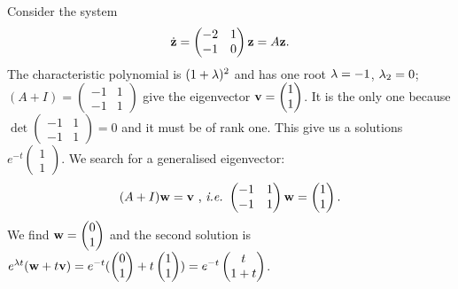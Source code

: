 \begin{exemple}
Consider the system
$$ \dot{\mathbf{z}}=
\begin{pmatrix} -2&1\\-1&0 \end{pmatrix}\mathbf{z} =A\mathbf{z}.
$$
The characteristic polynomial is $(1+\lambda)^2$ and has one root $\lambda=-1$, $\lambda_2=0$; $(A+I)=\begin{pmatrix} -1&1\\-1&1 \end{pmatrix}$ give the eigenvector $\mathbf{v}=\begin{pmatrix}1\\1\end{pmatrix}$. It is the only one because $\det \begin{pmatrix} -1&1\\-1&1 \end{pmatrix} =0$ and it must be of rank one. This give us a solutions $e^{-t}\begin{pmatrix}1\\1\end{pmatrix}$. We search for a generalised eigenvector:
$$(A+I)\mathbf{w}=\mathbf{v} \text{ , \emph{i.e.\ }} \begin{pmatrix} -1&1\\-1&1 \end{pmatrix}\mathbf{w}= \begin{pmatrix}1\\1\end{pmatrix}.$$
We find $\mathbf{w}=\begin{pmatrix}0\\1\end{pmatrix}$ and the second solution is $e^{\lambda t}(\mathbf{w}+t\mathbf{v}) = e^{-t}(\begin{pmatrix}0\\1\end{pmatrix}+t\begin{pmatrix}1\\1\end{pmatrix}) = e^{-t}\begin{pmatrix}t\\1+t\end{pmatrix}$.
\end{exemple}


